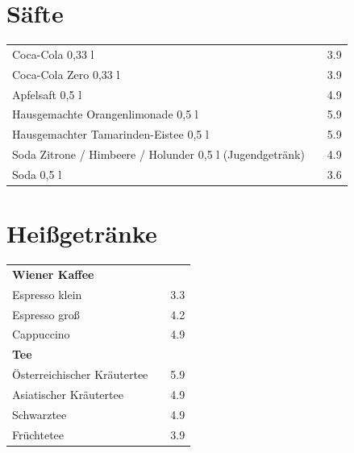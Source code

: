 \documentclass[a4paper,12pt]{article}
\begin{document}
\small
\titlespacing*{\section}{0pt}{0.45em}{0.25em}
\setlength{\columnsep}{0.7cm}
\begin{multicols}{2}

\section*{Säfte}
\begin{tabular}{Lrr}
Coca-Cola 0,33 l & & 3.9\\
Coca-Cola Zero 0,33 l & & 3.9\\
Apfelsaft 0,5 l & & 4.9\\
Hausgemachte Orangenlimonade 0,5 l & & 5.9\\
Hausgemachter Tamarinden-Eistee 0,5 l & & 5.9\\
Soda Zitrone / Himbeere / Holunder 0,5 l (Jugendgetränk) & & 4.9\\
Soda 0,5 l & & 3.6
\end{tabular}

\section*{Heißgetränke}
\begin{tabular}{Lrr}
\textbf{Wiener Kaffee}\\
\hspace{0.4cm}Espresso klein & & 3.3\\
\hspace{0.4cm}Espresso groß & & 4.2\\
\hspace{0.4cm}Cappuccino & & 4.9\vspace{0.1cm}\\
\textbf{Tee}\\
\hspace{0.4cm}Österreichischer Kräutertee & & 5.9\\
\hspace{0.4cm}Asiatischer Kräutertee & & 4.9\\
\hspace{0.4cm}Schwarztee & & 4.9\\
\hspace{0.4cm}Früchtetee & & 3.9
\end{tabular}


\end{multicols}
\end{document}
